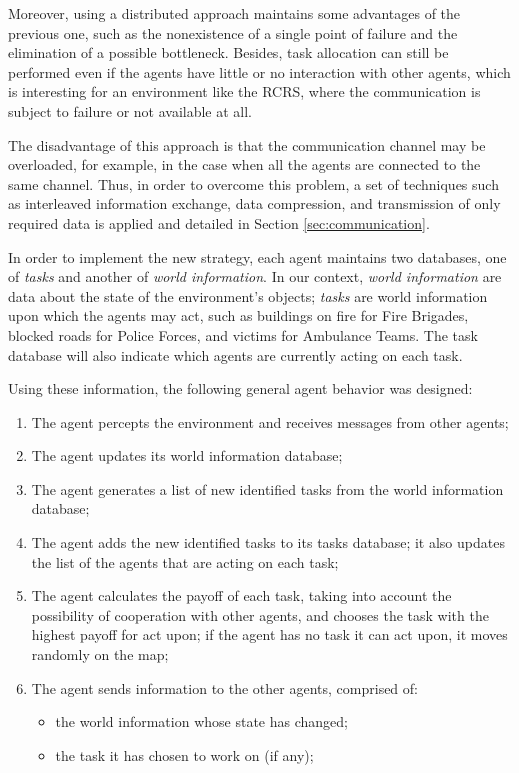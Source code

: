 \documentclass{llncs}
\begin{document}
Moreover, using a distributed approach maintains some advantages of the previous one, such as the nonexistence of a single point of failure and the elimination of a possible bottleneck. Besides, task allocation can still be performed even if the agents have little or no interaction with other agents, which is interesting for an environment like the RCRS, where the communication is subject to failure or not available at all.

The disadvantage of this approach is that the communication channel may be overloaded, for example, in the case when all the agents are connected to the same channel. Thus, in order to overcome this problem, a set of techniques such as interleaved information exchange, data compression, and transmission of only required data is applied and detailed in Section \ref{sec:communication}.

In order to implement the new strategy, each agent maintains two databases, one of {\it tasks} and another of {\it world information}. In our context, {\it world information} are data about the state of the environment's objects; {\it tasks} are world information upon which the agents may act, such as buildings on fire for Fire Brigades, blocked roads for Police Forces, and victims for Ambulance Teams. The task database will also indicate which agents are currently acting on each task.

Using these information, the following general agent behavior was designed:
\begin{enumerate}
\item The agent percepts the environment and receives messages from other agents;
\item The agent updates its world information database;
\item The agent generates a list of new identified tasks from the world information database;
\item The agent adds the new identified tasks to its tasks database; it also updates the list of the agents that are acting on each task;
\item The agent calculates the payoff of each task, taking into account the possibility of cooperation with other agents, and chooses the task with the highest payoff for act upon; if the agent has no task it can act upon, it moves randomly on the map;
\item The agent sends information to the other agents, comprised of:
\begin{itemize}
\item the world information whose state has changed;
\item the task it has chosen to work on (if any);
\end{itemize}
\end{enumerate}
\end{document}
